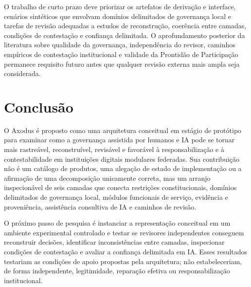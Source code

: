 \documentclass[11pt]{article}
\begin{document}
O trabalho de curto prazo deve priorizar os artefatos de derivação e interface,
cenários sintéticos que envolvam domínios delimitados de governança local e
tarefas de revisão adequadas a estudos de reconstrução, coerência entre
camadas, condições de contestação e confiança delimitada. O aprofundamento
posterior da literatura sobre qualidade da governança, independência do
revisor, caminhos empíricos de contestação institucional e validade da
Prontidão de Participação permanece requisito futuro antes que qualquer
revisão externa mais ampla seja considerada.

\section{Conclusão}

O Axodus é proposto como uma arquitetura conceitual em estágio de protótipo
para examinar como a governança assistida por humanos e IA pode se tornar mais
rastreável, reconstruível, revisável e favorável à responsabilização e à
contestabilidade em instituições digitais modulares federadas. Sua
contribuição não é um catálogo de produtos, uma alegação de estado de
implementação ou a afirmação de uma decomposição unicamente correta, mas um
arranjo inspecionável de seis camadas que conecta restrições constitucionais,
domínios delimitados de governança local, módulos funcionais de serviço,
evidência e proveniência, assistência consultiva de IA e caminhos de revisão.

O próximo passo de pesquisa é instanciar a representação conceitual em um
ambiente experimental controlado e testar se revisores independentes conseguem
reconstruir decisões, identificar inconsistências entre camadas, inspecionar
condições de contestação e avaliar a confiança delimitada em IA. Esses
resultados testariam as condições de apoio propostas pela arquitetura; não
estabeleceriam, de forma independente, legitimidade, reparação efetiva ou
responsabilização institucional.

\renewcommand{\bibpreamble}{%
\noindent As referências são mantidas em \texttt{references.bib}. Registros de
verificação de todas as entradas citadas são mantidos nos controles
bibliográficos do repositório; a rechecagem final dos metadados é necessária
antes de qualquer submissão, divulgação pública ou circulação externa.\par\medskip}


\end{document}
